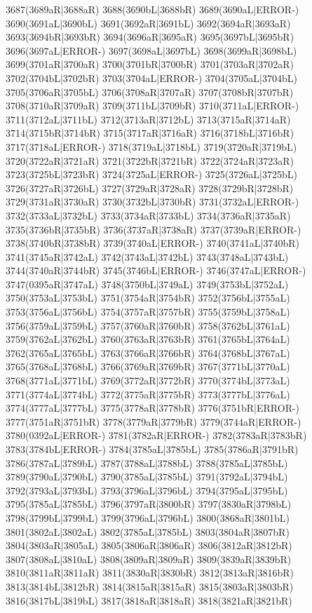 3687(3689aR|3688aR) 3688(3690bL|3688bR) 3689(3690aL|ERROR-) \\3690(3691aL|3690bL) 3691(3692aR|3691bL) 3692(3694aR|3693aR) 3693(3694bR|3693bR) 3694(3696aR|3695aR) 3695(3697bL|3695bR) 3696(3697aL|ERROR-) 3697(3698aL|3697bL) 3698(3699aR|3698bL) \\3699(3701aR|3700aR) 3700(3701bR|3700bR) 3701(3703aR|3702aR) 3702(3704bL|3702bR) 3703(3704aL|ERROR-) 3704(3705aL|3704bL) 3705(3706aR|3705bL) 3706(3708aR|3707aR) 3707(3708bR|3707bR) \\3708(3710aR|3709aR) 3709(3711bL|3709bR) 3710(3711aL|ERROR-) 3711(3712aL|3711bL) 3712(3713aR|3712bL) 3713(3715aR|3714aR) 3714(3715bR|3714bR) 3715(3717aR|3716aR) 3716(3718bL|3716bR) \\3717(3718aL|ERROR-) 3718(3719aL|3718bL) 3719(3720aR|3719bL) 3720(3722aR|3721aR) 3721(3722bR|3721bR) 3722(3724aR|3723aR) 3723(3725bL|3723bR) 3724(3725aL|ERROR-) 3725(3726aL|3725bL) \\3726(3727aR|3726bL) 3727(3729aR|3728aR) 3728(3729bR|3728bR) 3729(3731aR|3730aR) 3730(3732bL|3730bR) 3731(3732aL|ERROR-) 3732(3733aL|3732bL) 3733(3734aR|3733bL) 3734(3736aR|3735aR) \\3735(3736bR|3735bR) 3736(3737aR|3738aR) 3737(3739aR|ERROR-) 3738(3740bR|3738bR) 3739(3740aL|ERROR-) 3740(3741aL|3740bR) 3741(3745aR|3742aL) 3742(3743aL|3742bL) 3743(3748aL|3743bL) \\3744(3740aR|3744bR) 3745(3746bL|ERROR-) 3746(3747aL|ERROR-) 3747(0395aR|3747aL) 3748(3750bL|3749aL) 3749(3753bL|3752aL) 3750(3753aL|3753bL) 3751(3754aR|3754bR) 3752(3756bL|3755aL) \\3753(3756aL|3756bL) 3754(3757aR|3757bR) 3755(3759bL|3758aL) 3756(3759aL|3759bL) 3757(3760aR|3760bR) 3758(3762bL|3761aL) 3759(3762aL|3762bL) 3760(3763aR|3763bR) 3761(3765bL|3764aL) \\3762(3765aL|3765bL) 3763(3766aR|3766bR) 3764(3768bL|3767aL) 3765(3768aL|3768bL) 3766(3769aR|3769bR) 3767(3771bL|3770aL) 3768(3771aL|3771bL) 3769(3772aR|3772bR) 3770(3774bL|3773aL) \\3771(3774aL|3774bL) 3772(3775aR|3775bR) 3773(3777bL|3776aL) 3774(3777aL|3777bL) 3775(3778aR|3778bR) 3776(3751bR|ERROR-) 3777(3751aR|3751bR) 3778(3779aR|3779bR) 3779(3744aR|ERROR-) \\3780(0392aL|ERROR-) 3781(3782aR|ERROR-) 3782(3783aR|3783bR) 3783(3784bL|ERROR-) 3784(3785aL|3785bL) 3785(3786aR|3791bR) 3786(3787aL|3789bL) 3787(3788aL|3788bL) 3788(3785aL|3785bL) \\3789(3790aL|3790bL) 3790(3785aL|3785bL) 3791(3792aL|3794bL) 3792(3793aL|3793bL) 3793(3796aL|3796bL) 3794(3795aL|3795bL) 3795(3785aL|3785bL) 3796(3797aR|3800bR) 3797(3830aR|3798bL) \\3798(3799bL|3799bL) 3799(3796aL|3796bL) 3800(3868aR|3801bL) 3801(3802aL|3802aL) 3802(3785aL|3785bL) 3803(3804aR|3807bR) 3804(3803aR|3805aL) 3805(3806aR|3806aR) 3806(3812aR|3812bR) \\3807(3808aL|3810aL) 3808(3809aR|3809aR) 3809(3839aR|3839bR) 3810(3811aR|3811aR) 3811(3830aR|3830bR) 3812(3813aR|3816bR) 3813(3814bL|3812bR) 3814(3815aR|3815aR) 3815(3803aR|3803bR) \\3816(3817bL|3819bL) 3817(3818aR|3818aR) 3818(3821aR|3821bR) 
